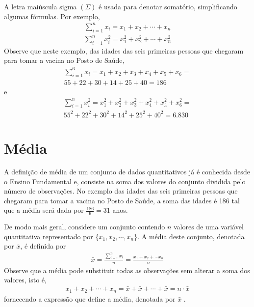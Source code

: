 A letra maiúscula sigma \(\left (\Sigma\right )\) é usada para denotar somatório, simplificando algumas fórmulas. Por exemplo,
\begin{equation*}
\begin{split}\sum^n_{i=1} x_i=x_1+x_2+\cdots +x_n\end{split}
\end{equation*}
\begin{equation*}
\begin{split}\sum^n_{i=1} x^2_i=x^2_1+x^2_2+\cdots +x^2_n\end{split}
\end{equation*}
Observe que neste exemplo, das idades das seis primeiras pessoas que chegaram para tomar a vacina no Posto de Saúde,
\begin{equation*}
\begin{split}\sum^6_{i=1}x_i=x_1+x_2+x_3+x_4+x_5+x_6=\\
55 + 22 + 30 + 14 + 25 + 40 = 186\end{split}
\end{equation*}
e
\begin{equation*}
\begin{split}\sum^n_{i=1} x^2_i=x^2_1+x^2_2+x^2_3+x^2_4+x^2_5 +x^2_6=\\
55^2+ 22^2+ 30^2+ 14^2+ 25^2+  40^2=6.830\end{split}
\end{equation*}

\section{Média}

A definição de média de um conjunto de dados quantitativos já é conhecida desde o Ensino Fundamental e, consiste na soma dos valores do conjunto dividida pelo número de observações. No exemplo das idades das seis primeiras pessoas que chegaram para tomar a vacina no Posto de Saúde, a soma das idades é 186 tal que a média será dada por \(\frac{186}{6}=31\) anos.

De modo mais geral, considere um conjunto contendo \(n\) valores de uma variável quantitativa representado por \(\{x_1,x_2,\cdots,x_n\}\).
A média deste conjunto, denotada por \(\bar{x}\),  é definida por
\begin{equation*}
\begin{split}\bar{x}=\frac{\sum^n_{i=1}x_i}{n}=\frac{x_1+x_2+\cdots x_n}{n}\end{split}
\end{equation*}
Observe que a média pode substituir todas as observações sem alterar a  soma dos valores, isto é,
\begin{equation*}
\begin{split}x_1+x_2+\cdots+x_n=\bar{x}+\bar{x}+\cdots+\bar{x} = n\cdot \bar{x}\end{split}
\end{equation*}
fornecendo a expressão que define a média, denotada por \(\bar{x}\) .

